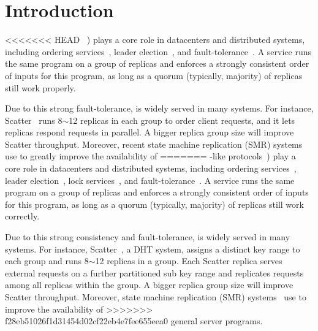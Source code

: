 \section{Introduction} \label{sec:intro}


<<<<<<< HEAD
\paxos~\cite{paxos:practical,paxos,paxos:simple,paxos:complex}) plays a core 
role in datacenters and distributed systems, including ordering 
services~\cite{ellis:thesis,manos:hotdep10,scatter:sosp11}, 
leader election~\cite{zookeeper, chubby:osdi}, and 
fault-tolerance~\cite{eve:osdi12,rex:eurosys14,crane:sosp15}. A \paxos service 
runs the same program on a group of replicas and enforces a strongly 
consistent order of inputs for this program, as long as a quorum (typically, 
majority) of replicas still work properly.

Due to this strong fault-tolerance, \paxos is widely served in many systems. 
For instance, Scatter~\cite{scatter:sosp11} runs 8$\sim$12 replicas in each 
\paxos group to order client requests, and it lets replicas respond requests 
in parallel. A bigger replica group size will improve Scatter throughput. 
Moreover, recent state machine replication (SMR) systems~\cite{ crane:sosp15, 
eve:osdi12, rex:eurosys14} use \paxos to greatly improve the availability of 
=======
\paxos-like protocols~\cite{paxos:practical,paxos,paxos:simple,paxos:complex})
play a core role in datacenters and distributed systems, including ordering
services~\cite{ellis:thesis,manos:hotdep10,scatter:sosp11},
leader election~\cite{zookeeper}, lock services~\cite{chubby:osdi}, and
fault-tolerance~\cite{eve:osdi12,rex:eurosys14,crane:sosp15}. A \paxos service
runs the same program on a group of replicas and enforces a strongly
consistent order of inputs for this program, as long as a quorum (typically,
majority) of replicas still work correctly.

Due to this strong consistency and fault-tolerance, \paxos is widely served
in many systems. For instance, Scatter~\cite{scatter:sosp11}, a DHT system,
assigns a distinct key range to each \paxos group and runs 8$\sim$12 replicas
in a group. Each Scatter replica serves external requests on a further
partitioned sub key range and replicates requests among all replicas within the
group. A bigger replica group size will improve Scatter throughput.
Moreover, state machine replication (SMR) systems~\cite{ crane:sosp15,
eve:osdi12, rex:eurosys14} use \paxos to improve the availability of
>>>>>>> f28eb51026f1d31454d02cf22eb4e7fee655eea0
general server programs.




